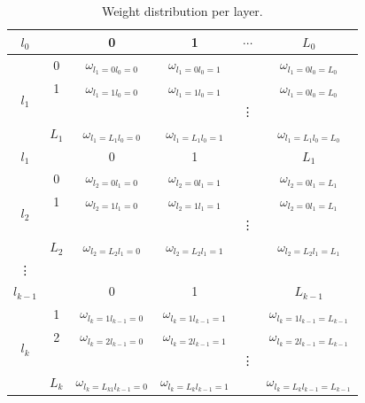 \documentclass[final, paper=letter,5p,times,twocolumn]{elsarticle}
\begin{document}
\begin{table}[]
\centering
\caption{Weight distribution per layer.}
\label{weights_distribution}
\begin{tabular}{|c|c|c|c|c|c|}
\hline
$l_{0}$                   && 0                                   & 1                        & $\cdots$ & $L_{0}$ \\ \hline
\multirow{4}{*}{$l_{1}$}  &0& $\omega_{l_{1}=0l_{0}=0}$              & $\omega_{l_{1}=0l_{0}=1}$    &        & $\omega_{l_{1}=0l_{0}=L_{0}}$ \\ \cline{2-6} 
                         &1& $\omega_{l_{1}=1l_{0}=0}$              & $\omega_{l_{1}=1l_{0}=1}$    &        & $\omega_{l_{1}=0l_{0}=L_{0}}$ \\ \cline{2-6} 
                         &&                                     &                          & \vdots & \\ \cline{2-6} 
                         &$L_{1}$& $\omega_{l_{1}=L_{1}l_{0}=0}$      & $\omega_{l_{1}=L_{1}l_{0}=1}$ &        & $\omega_{l_{1}=L_{1}l_{0}=L_{0}}$ \\ \hline
$l_{1}$                   && 0                                   & 1                       &        & $L_{1}$ \\ \hline
\multirow{4}{*}{$l_{2}$}  &0& $\omega_{l_{2}=0l_{1}=0}$              &  $\omega_{l_{2}=0l_{1}=1}$   &        &  $\omega_{l_{2}=0l_{1}=L_{1}}$ \\ \cline{2-6} 
                         &1& $\omega_{l_{2}=1l_{1}=0}$              &  $\omega_{l_{2}=1l_{1}=1}$   &        &   $\omega_{l_{2}=0l_{1}=L_{1}}$ \\ \cline{2-6} 
                         &&                                     &                          & \vdots & \\ \cline{2-6} 
                         &$L_{2}$&$\omega_{l_{2}=L_{2}l_{1}=0}$       & $\omega_{l_{2}=L_{2}l_{1}=1}$ &        & $\omega_{l_{2}=L_{2}l_{1}=L_{1}}$ \\ \hline
\vdots                   &&                                     &                         &        & \\ \hline
$l_{k-1}$                 && 0                                   &  1                      &        &  $L_{k-1}$ \\ \hline
\multirow{4}{*}{$l_{k}$}  &1& $\omega_{l_{k}=1l_{k-1}=0}$            & $\omega_{l_{k}=1l_{k-1}=1}$  &        & $\omega_{l_{k}=1l_{k-1}=L_{k-1}}$ \\ \cline{2-6} 
                         &2& $\omega_{l_{k}=2l_{k-1}=0}$            & $\omega_{l_{k}=2l_{k-1}=1}$  &        &  $\omega_{l_{k}=2l_{k-1}=L_{k-1}}$ \\ \cline{2-6} 
                         &&                                    &                         & \vdots & \\ \cline{2-6} 
                         &$L_{k}$& $\omega_{l_{k}=L_{k1}l_{k-1}=0}$   & $\omega_{l_{k}=L_{k}l_{k-1}=1}$ &        &  $\omega_{l_{k}=L_{k}l_{k-1}=L_{k-1}}$ \\ \hline
\end{tabular}
\end{table}
\end{document}
